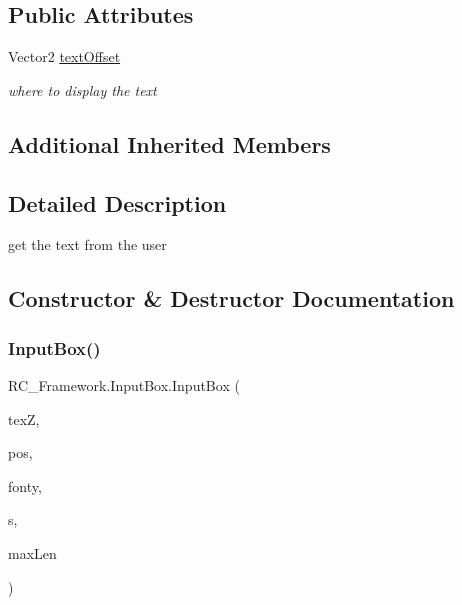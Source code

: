 \subsection*{Public Attributes}
\begin{DoxyCompactItemize}
\item 
Vector2 \mbox{\hyperlink{class_r_c___framework_1_1_input_box_a96345a99971dd664242c1f9c1e0231a7}{text\+Offset}}
\begin{DoxyCompactList}\small\item\em where to display the text \end{DoxyCompactList}\end{DoxyCompactItemize}
\subsection*{Additional Inherited Members}


\subsection{Detailed Description}
get the text from the user 



\subsection{Constructor \& Destructor Documentation}
\mbox{\label{class_r_c___framework_1_1_input_box_ad692dce3ce7a7a99916b510aa88b9354}} 
\subsubsection{\texorpdfstring{Input\+Box()}{InputBox()}\hspace{0.1cm}{\footnotesize\ttfamily [1/2]}}
{\footnotesize\ttfamily R\+C\+\_\+\+Framework.\+Input\+Box.\+Input\+Box (\begin{DoxyParamCaption}\item[{Texture2D}]{texZ,  }\item[{Vector2}]{pos,  }\item[{Sprite\+Font}]{fonty,  }\item[{string}]{s,  }\item[{int}]{max\+Len }\end{DoxyParamCaption})}



